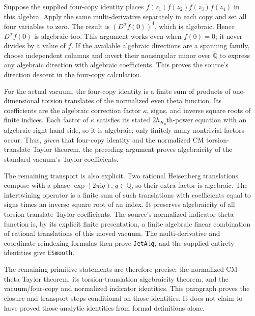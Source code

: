 \documentclass[11pt,a4paper]{article}
\numberwithin{equation}{section}
\theoremstyle{remark}\newtheorem{remark}[theorem]{Remark}
\begin{document}
Suppose the supplied four-copy identity places
$f(z_1)f(z_2)f(z_3)f(z_4)$ in this algebra. Apply the same
multi-derivative separately in each copy and set all four
variables to zero. The result is $(D^\alpha f(0))^4$, which is
algebraic. Hence $D^\alpha f(0)$ is algebraic too. This argument
works even when $f(0)=0$; it never divides by a value of $f$.
If the available algebraic directions are a spanning family,
choose independent columns and invert their nonsingular minor
over $\overline{\mathbb Q}$ to express any algebraic direction
with algebraic coefficients. This proves the source's direction
descent in the four-copy calculation.

For the actual vacuum, the four-copy identity is a finite sum
of products of one-dimensional torsion translates of the
normalized even theta function. Its coefficients are the
algebraic correction factor $\kappa$, signs, and inverse square
roots of finite indices. Each factor of $\kappa$ satisfies its
stated $2h_{K_0}$th-power equation with an algebraic right-hand
side, so it is algebraic; only finitely many nontrivial factors
occur. Thus, \emph{given} that four-copy identity and the
normalized CM torsion-translate Taylor theorem, the preceding
argument proves algebraicity of the standard vacuum's Taylor
coefficients.

The remaining transport is also explicit. Two rational
Heisenberg translations compose with a phase
$\exp(2\pi\mathrm i q)$, $q\in\mathbb Q$, so their extra factor
is algebraic. The intertwining operator is a finite sum of such
translations with coefficients equal to signs times an inverse
square root of an index. It preserves algebraicity of all
torsion-translate Taylor coefficients. The source's normalized
indicator theta function is, by its explicit finite presentation,
a finite algebraic linear combination of rational translations
of this moved vacuum. The multi-derivative and coordinate
reindexing formulas then prove \texttt{JetAlg}, and the supplied
entirety identities give \texttt{ESmooth}.

The remaining primitive statements are therefore precise: the
normalized CM theta Taylor theorem, its torsion-translation
algebraicity theorem, and the vacuum/four-copy and normalized
indicator identities. This paragraph proves the closure and
transport steps conditional on those identities. It does not
claim to have proved those analytic identities from formal
definitions alone.
\end{document}
